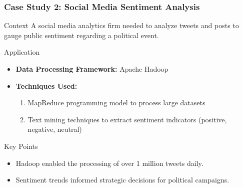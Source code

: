 \documentclass[aspectratio=169]{beamer}
\begin{document}
\begin{frame}[fragile]
    \frametitle{Case Study 2: Social Media Sentiment Analysis}
    \begin{block}{Context}
        A social media analytics firm needed to analyze tweets and posts to gauge public sentiment regarding a political event.
    \end{block}
    \begin{block}{Application}
        \begin{itemize}
            \item \textbf{Data Processing Framework:} Apache Hadoop
            \item \textbf{Techniques Used:}
            \begin{enumerate}
                \item MapReduce programming model to process large datasets
                \item Text mining techniques to extract sentiment indicators (positive, negative, neutral)
            \end{enumerate}
        \end{itemize}
    \end{block}
    \begin{block}{Key Points}
        \begin{itemize}
            \item Hadoop enabled the processing of over 1 million tweets daily.
            \item Sentiment trends informed strategic decisions for political campaigns.
        \end{itemize}
    \end{block}
\end{frame}
\end{document}
